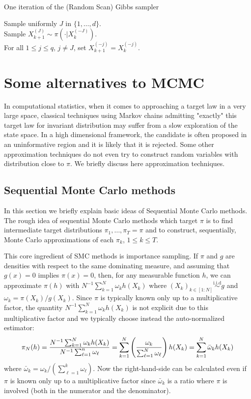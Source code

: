 \documentclass[english,graybox,envcountchap,envcountsame,sectrefs,shortlabels]{svmono}
\theoremstyle{style}
\newcommand{\iid}{\stackrel{\mathrm{i.i.d}}{\sim}}
\begin{document}
\begin{algorithm}
\caption{One iteration of the (Random Scan) Gibbs sampler}
{}
\BlankLine
Sample uniformly $J$ in $\{1,\ldots,d\}$.\\
Sample $X_{k+1}^{(J)} \sim \pi(\cdot |X_k^{(-J)})$.\\
For all $1\leq j\leq q$, $j\neq J$, set $X_{k+1}^{(-j)}=X_k^{(-j)}$.
\end{algorithm}


\section{Some alternatives to MCMC}
In computational statistics, when it comes to approaching a target law in a very large space,
classical techniques using Markov chains admitting "exactly" this target law
for invariant distribution may suffer from a slow exploration of the state space. In a high dimensional framework, the candidate is often proposed in an uninformative region and it is likely that it is rejected. Some other approximation techniques do not even try to construct random variables with distribution close to $\pi$. We briefly discuss here approximation techniques.

\subsection{Sequential Monte Carlo methods}
In this section we briefly explain basic ideas of Sequential Monte Carlo methods.
The rough idea of sequential Monte Carlo methods which target $\pi$ is to find intermediate target distributions $\pi_1, \ldots , \pi_T=\pi$ and to construct, sequentially, Monte Carlo approximations of each $\pi_k$, $1\leq k \leq T$.




This core ingredient of SMC methods is importance sampling. If $\pi$ and $g$ are densities with respect to  the same dominating measure, and assuming that $g(x)=0$ implies $\pi(x)=0$, then, for any measurable function $h$, we can approximate $\pi(h)$ with $N^{-1}\sum_{k=1}^N \omega_k h(X_k)$ where $(X_k)_{k\in[1:N]} \iid g$ and $\omega_k=\pi(X_k)/g(X_k)$. Since $\pi$ is typically known only up to a multiplicative factor, the quantity $N^{-1}\sum_{k=1}^N \omega_k h(X_k)$ is not explicit due to this multiplicative factor and we typically choose instead the auto-normalized estimator:
$$
\pi_N(h) = \frac{N^{-1}\sum_{k=1}^N \omega_k h(X_k)}{N^{-1}\sum_{\ell=1}^n \omega_\ell}=\sum_{k=1}^N \left(\frac{ \omega_k}{\sum_{\ell=1}^N \omega_\ell}\right)  h(X_k)=\sum_{k=1}^N \bar\omega_k  h(X_k)
$$
where  $\bar \omega_k=\omega_k/(\sum_{\ell=1}^{k} \omega_\ell)$. Now the right-hand-side can be calculated even if $\pi$ is known only up to a multiplicative factor since $\bar \omega_k$ is a ratio where $\pi$ is involved (both in the numerator and the denominator).
\end{document}
